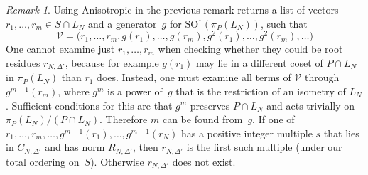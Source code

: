 \documentclass[12pt]{amsart}
\def\calV{\mathcal{V}}
\def\SO{\mathrm{SO}}
\def\SOup{\SO^{\uparrow}}
\def\D{\Delta}
\def\SOup{\mathrm{SO}^{\uparrow}}
\numberwithin{theorem}{section}
\numberwithin{equation}{section}
\numberwithin{figure}{section}
\theoremstyle{remark}
\newtheorem{remark}[theorem]{Remark}
\begin{document}
\begin{remark}
    Using {\sf Anisotropic}
    in the previous remark returns a list
    of vectors $r_1,\dots,r_m\in S\cap L_N$ and a generator~$g$
    for $\SOup(\pi_P(L_N))$, such that
    $$
    \calV=\bigl(r_1,\dots,r_m,g(r_1),\dots,g(r_m),g^2(r_1),\dots,g^2(r_m),\dots\bigr)
    $$
    One cannot examine just  $r_1,\dots,r_m$ when checking
    whether they could be 
    root residues $r_{N,\D'}$, because for example $g(r_1)$
    may lie in a different coset of $P\cap L_N$ in $\pi_P(L_N)$
    than $r_1$ does.  Instead, one
    must examine all terms of $\calV$ through
    $g^{m-1}(r_m)$, where $g^m$ is a
    power of~$g$ that is the restriction of an
    isometry of $L_N$.  Sufficient conditions for this are that
    $g^m$ preserves $P\cap L_N$
    and acts trivially on $\pi_P(L_N)/(P\cap L_N)$.  Therefore
    $m$ can be found from~$g$. 
    If  one of
    $r_1,\dots,r_m,\dots,g^{m-1}(r_1),\dots,g^{m-1}(r_N)$
    has a positive integer multiple $s$ that
    lies in $C_{N,\D'}$ and has norm $R_{N,\D'}$,
    then $r_{N,\D'}$ is the first such multiple (under
    our total ordering on~$S$).
    Otherwise
    $r_{N,\D'}$ does not exist.
\end{remark}
\end{document}
